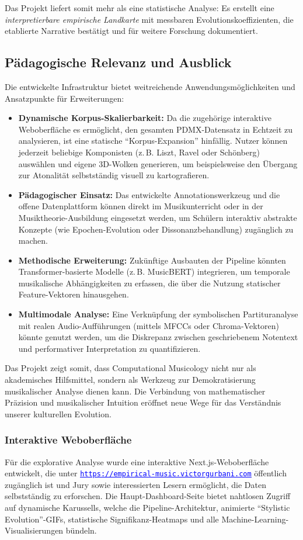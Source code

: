 \documentclass[10pt,a4paper]{article}
\theoremstyle{definition}
\newcommand{\linkurl}[1]{\href{#1}{\textcolor{blue}{\underline{\small\nolinkurl{#1}}}}}
\begin{document}
Das Projekt liefert somit mehr als eine statistische Analyse: Es erstellt eine \emph{interpretierbare empirische Landkarte} mit messbaren Evolutionskoeffizienten, die etablierte Narrative bestätigt und für weitere Forschung dokumentiert.

\subsection{Pädagogische Relevanz und Ausblick}\label{sec:outlook}
Die entwickelte Infrastruktur bietet weitreichende Anwendungsmöglichkeiten und Ansatzpunkte für Erweiterungen:
\begin{itemize}
    \item \textbf{Dynamische Korpus-Skalierbarkeit:} Da die zugehörige interaktive Weboberfläche es ermöglicht, den gesamten PDMX-Datensatz in Echtzeit zu analysieren, ist eine statische \enquote{Korpus-Expansion} hinfällig. Nutzer können jederzeit beliebige Komponisten (z.\,B. Liszt, Ravel oder Schönberg) auswählen und eigene 3D-Wolken generieren, um beispielsweise den Übergang zur Atonalität selbstständig visuell zu kartografieren.
    \item \textbf{Pädagogischer Einsatz:} Das entwickelte Annotationswerkzeug und die offene Datenplattform können direkt im Musikunterricht oder in der Musiktheorie-Ausbildung eingesetzt werden, um Schülern interaktiv abstrakte Konzepte (wie Epochen-Evolution oder Dissonanzbehandlung) zugänglich zu machen.
    \item \textbf{Methodische Erweiterung:} Zukünftige Ausbauten der Pipeline könnten Transformer-basierte Modelle (z.\,B. MusicBERT) integrieren, um temporale musikalische Abhängigkeiten zu erfassen, die über die Nutzung statischer Feature-Vektoren hinausgehen.
    \item \textbf{Multimodale Analyse:} Eine Verknüpfung der symbolischen Partituranalyse mit realen Audio-Aufführungen (mittels MFCCs oder Chroma-Vektoren) könnte genutzt werden, um die Diskrepanz zwischen geschriebenem Notentext und performativer Interpretation zu quantifizieren.
\end{itemize}

Das Projekt zeigt somit, dass Computational Musicology nicht nur als akademisches Hilfsmittel, sondern als Werkzeug zur Demokratisierung musikalischer Analyse dienen kann. Die Verbindung von mathematischer Präzision und musikalischer Intuition eröffnet neue Wege für das Verständnis unserer kulturellen Evolution.

\subsubsection{Interaktive Weboberfläche}\label{sec:weboberflache}
Für die explorative Analyse wurde eine interaktive Next.js-Weboberfläche entwickelt, die unter \linkurl{https://empirical-music.victorgurbani.com} öffentlich zugänglich ist und Jury sowie interessierten Lesern ermöglicht, die Daten selbstständig zu erforschen. Die Haupt-Dashboard-Seite bietet nahtlosen Zugriff auf dynamische Karussells, welche die Pipeline-Architektur, animierte \enquote{Stylistic Evolution}-GIFs, statistische Signifikanz-Heatmaps und alle Machine-Learning-Visualisierungen bündeln. 
\end{document}
